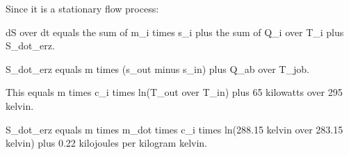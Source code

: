 Since it is a stationary flow process:  

dS over dt equals the sum of m_i times s_i plus the sum of Q_i over T_i plus S_dot_erz.  

S_dot_erz equals m times (s_out minus s_in) plus Q_ab over T_job.  

This equals m times c_i times ln(T_out over T_in) plus 65 kilowatts over 295 kelvin.  

S_dot_erz equals m times m_dot times c_i times ln(288.15 kelvin over 283.15 kelvin) plus 0.22 kilojoules per kilogram kelvin.